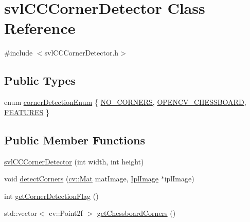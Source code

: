\hypertarget{classsvl_c_c_corner_detector}{\section{svl\-C\-C\-Corner\-Detector Class Reference}
\label{classsvl_c_c_corner_detector}
}


{\ttfamily \#include $<$svl\-C\-C\-Corner\-Detector.\-h$>$}

\subsection*{Public Types}
\begin{DoxyCompactItemize}
\item 
enum \hyperlink{classsvl_c_c_corner_detector_a50a5ca9344335a09a544cc7c4e3481d4}{corner\-Detection\-Enum} \{ \hyperlink{classsvl_c_c_corner_detector_a50a5ca9344335a09a544cc7c4e3481d4a3449dc3faed7b2837c56942e6e5a4bbd}{N\-O\-\_\-\-C\-O\-R\-N\-E\-R\-S}, 
\hyperlink{classsvl_c_c_corner_detector_a50a5ca9344335a09a544cc7c4e3481d4aca65612af3840560ad3a6472318ceb0e}{O\-P\-E\-N\-C\-V\-\_\-\-C\-H\-E\-S\-S\-B\-O\-A\-R\-D}, 
\hyperlink{classsvl_c_c_corner_detector_a50a5ca9344335a09a544cc7c4e3481d4a70f7c0ba4e67fdbacfb5f213693a057f}{F\-E\-A\-T\-U\-R\-E\-S}
 \}
\end{DoxyCompactItemize}
\subsection*{Public Member Functions}
\begin{DoxyCompactItemize}
\item 
\hyperlink{classsvl_c_c_corner_detector_a3a5431e2865fe321e0ff3e94ab6ca0ba}{svl\-C\-C\-Corner\-Detector} (int width, int height)
\item 
void \hyperlink{classsvl_c_c_corner_detector_ac05cb12f874f206d83e3e332ca65b196}{detect\-Corners} (\hyperlink{namespacecv_a60d81b54f4914bec4cc4a72ab77eb444}{cv\-::\-Mat} mat\-Image, \hyperlink{svl_types_8h_aa5a40a13021ba9708bfe921e18fdfa53}{Ipl\-Image} $\ast$ipl\-Image)
\item 
int \hyperlink{classsvl_c_c_corner_detector_ac6d1bb5e6915c6cffb2817607a3ca2fa}{get\-Corner\-Detection\-Flag} ()
\item 
std\-::vector$<$ cv\-::\-Point2f $>$ \hyperlink{classsvl_c_c_corner_detector_a3bd8600da0171e5461532a3f15f05195}{get\-Chessboard\-Corners} ()
\end{DoxyCompactItemize}


